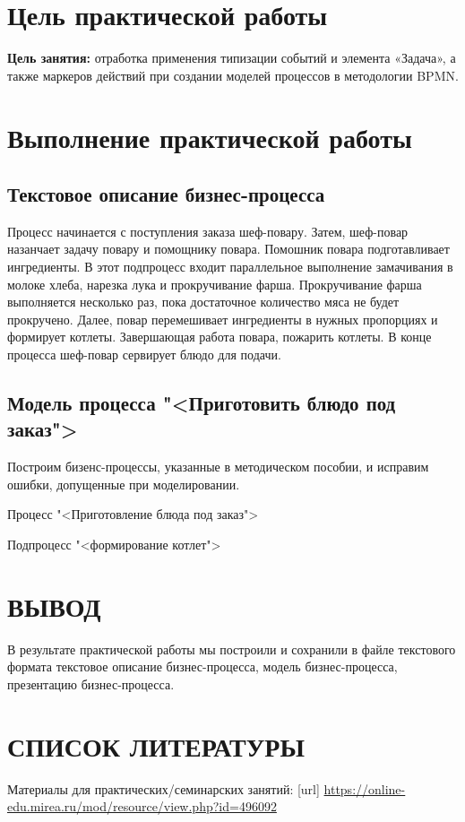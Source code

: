 \graphicspath{{./13/img/}}

\section{Цель практической работы}
\textbf{Цель занятия:}
отработка применения типизации событий и элемента
«Задача», а также маркеров действий при создании моделей процессов в
методологии BPMN.

\section{Выполнение практической работы}
\subsection{Текстовое описание бизнес-процесса}
Процесс начинается с поступления заказа шеф-повару.
Затем, шеф-повар назанчает задачу повару и помощнику повара.
Помошник повара подготавливает ингредиенты. В этот подпроцесс входит
параллельное выполнение замачивания в молоке хлеба, нарезка лука
и прокручивание фарша. Прокручивание фарша выполняется несколько раз,
пока достаточное количество мяса не будет прокручено.
Далее, повар перемешивает ингредиенты в нужных пропорциях и формирует котлеты.
Завершающая работа повара, пожарить котлеты. В конце процесса шеф-повар
сервирует блюдо для подачи.

\subsection{Модель процесса "<Приготовить блюдо под заказ">}
Построим бизенс-процессы, указанные в методическом пособии, и исправим ошибки, допущенные при моделировании.
\begin{image}
	\caption{Процесс "<Приготовление блюда под заказ">}
\end{image}

\begin{image}
	\caption{Подпроцесс "<формирование котлет">}
\end{image}

\clearpage

\section*{ВЫВОД}
В результате практической работы  мы построили и сохранили в
файле текстового формата текстовое описание бизнес-процесса, модель
бизнес-процесса, презентацию бизнес-процесса.

\clearpage

\section*{СПИСОК ЛИТЕРАТУРЫ}
\begin{thebibliography}{}
    \bibitem{}  Материалы для практических/семинарских занятий: [url] 
		\url{https://online-edu.mirea.ru/mod/resource/view.php?id=496092}
\end{thebibliography}
